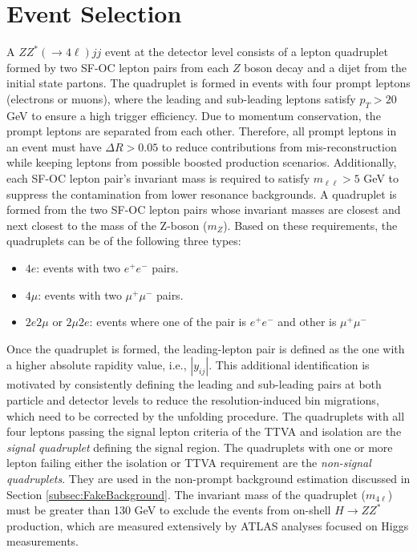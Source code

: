 \section{Event Selection}
\label{sec:EventSel}

A $ZZ^*(\rightarrow 4\ell) jj$ event at the detector level consists of a lepton quadruplet formed by two SF-OC lepton pairs from each $Z$ boson decay and a dijet from the initial state partons. The quadruplet is formed in events with four prompt leptons (electrons or muons), where the leading and sub-leading leptons satisfy $p_{T} > 20$ GeV to ensure a high trigger efficiency. Due to momentum conservation, the prompt leptons are separated from each other. Therefore, all prompt leptons in an event must have $\Delta R > 0.05$ to reduce contributions from mis-reconstruction while keeping leptons from possible boosted production scenarios. Additionally, each SF-OC lepton pair's invariant mass is required to satisfy $m_{\ell \ell } > 5$ GeV to suppress the contamination from lower resonance backgrounds. A quadruplet is formed from the two SF-OC lepton pairs whose invariant masses are closest and next closest to the mass of the Z-boson ($m_{Z}$). Based on these requirements, the quadruplets can be of the following three types:

\begin{itemize}
\item{$4e$: events with two $e^{+}e^{-}$ pairs.}
\item{$4\mu$: events with two $\mu^{+}\mu^{-}$ pairs.}
\item{$2e2\mu$ or $2\mu2e$: events where one of the pair is $e^{+}e^{-}$ and other is $\mu^{+}\mu^{-}$}
\end{itemize}

Once the quadruplet is formed, the leading-lepton pair is defined as the one with a higher absolute rapidity value, i.e., $|y_{ij}|$. This additional identification is motivated by consistently defining the leading and sub-leading pairs at both particle and detector levels to reduce the resolution-induced bin migrations, which need to be corrected by the unfolding procedure. The quadruplets with all four leptons passing the signal lepton criteria of the TTVA and isolation are the \textit{signal quadruplet} defining the signal region. The quadruplets with one or more lepton failing either the isolation or TTVA requirement are the \textit{non-signal quadruplets}. They are used in the non-prompt background estimation discussed in Section \ref{subsec:FakeBackground}. The invariant mass of the quadruplet ($m_{4\ell}$) must be greater than 130 GeV to exclude the events from on-shell $H\rightarrow ZZ^*$ production, which are measured extensively by ATLAS analyses focused on Higgs measurements.

